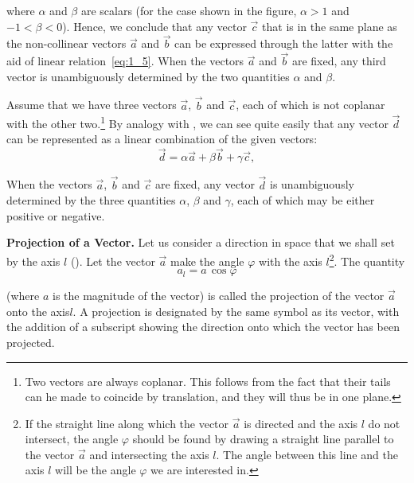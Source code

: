 \noindent
where $\alpha$ and $\beta$ are scalars (for the case shown in the figure, $\alpha>1$ and $-1<\beta<0$). Hence, we conclude that any vector $\vec{c}$ that is in the same plane as the non-collinear vectors $\vec{a}$ and $\vec{b}$ can be expressed through the latter with the aid of linear relation~\eqref{eq:1_5}. When the vectors $\vec{a}$ and $\vec{b}$ are fixed, any third vector is unambiguously determined by the two quantities $\alpha$ and $\beta$.

Assume that we have three vectors $\vec{a}$, $\vec{b}$ and $\vec{c}$, each of which is not coplanar with the other two.\footnote{Two vectors are always coplanar. This follows from the fact that their tails can he made to coincide by translation, and they will thus be in one plane.} By analogy with , we can see quite easily that any vector $\vec{d}$ can be represented as a linear combination of the given vectors:
\begin{equation}\label{eq:1_6}
\vec{d} = \alpha\vec{a} + \beta\vec{b} + \gamma\vec{c},
\end{equation}

\noindent
When the vectors $\vec{a}$, $\vec{b}$ and $\vec{c}$ are fixed, any vector $\vec{d}$ is unambiguously determined by the three quantities $\alpha$, $\beta$ and $\gamma$, each of which may be either positive or negative.

\textbf{Projection of a Vector.} Let us consider a direction in space that we shall set by the axis $l$ (). Let the vector $\vec{a}$ make the angle $\varphi$ with the axis $l$\footnote{If the straight line along which the vector $\vec{a}$ is directed and the axis $l$ do not intersect, the angle $\varphi$ should be found by drawing a straight line parallel to the vector $\vec{a}$ and intersecting the axis $l$. The angle between this line and the axis $l$ will be the angle $\varphi$ we are interested in.}. The quantity
\begin{equation}\label{eq:1_7}
a_l = a\, \cos\varphi
\end{equation}

\noindent
(where $a$ is the magnitude of the vector) is called the projection of the vector $\vec{a}$ onto the axis$l$. A projection is designated by the same symbol as its vector, with the addition of a subscript showing the direction onto which the vector has been projected. 

